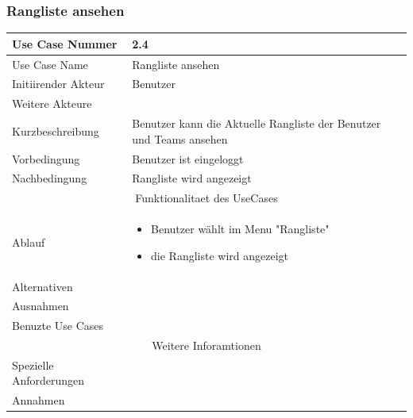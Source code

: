 \documentclass[10pt,a4paper]{article}
\begin{document}
\subsubsection{Rangliste ansehen}
		\begin{tabular}{|l|p{.5\linewidth}|}
		\hline Use Case Nummer & 2.4 \\ 
		\hline Use Case Name & Rangliste ansehen\\ 
		\hline Initiirender Akteur & Benutzer \\
		\hline Weitere Akteure &  \\
		\hline Kurzbeschreibung & Benutzer kann die Aktuelle Rangliste der Benutzer und Teams ansehen \\
		\hline Vorbedingung & Benutzer ist eingeloggt \\
		\hline Nachbedingung & Rangliste wird angezeigt \\
		\hline \multicolumn{2}{|c|}{Funktionalitaet des UseCases}\\
		\hline Ablauf & \begin{itemize}
			\item Benutzer w\"ahlt im Menu "Rangliste"
			\item die Rangliste wird angezeigt
		\end{itemize} \\
		\hline Alternativen &  \\
		\hline Ausnahmen &  \\
		\hline Benuzte Use Cases &  \\
		\hline \multicolumn{2}{|c|}{Weitere Inforamtionen} \\
		\hline Spezielle Anforderungen &  \\
		\hline Annahmen &  \\
		\hline
		\end{tabular}
\end{document}
